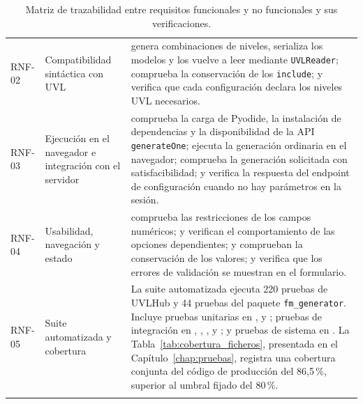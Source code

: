 \begin{longtable}{@{}P{1.3cm} P{2.6cm} P{\dimexpr\textwidth-3.9cm-4\tabcolsep\relax}@{}}
RNF-02 &
Compatibilidad sintáctica con UVL &
genera combinaciones de niveles, serializa los modelos y los vuelve a leer
mediante \texttt{UVLReader};
comprueba la conservación de los \texttt{include}; y
verifica que cada configuración declara los niveles UVL necesarios.
\\[0.9em]

RNF-03 &
Ejecución en el navegador e integración con el servidor &
comprueba la carga de Pyodide, la instalación de dependencias y la
disponibilidad de la API \texttt{generateOne};
ejecuta la generación ordinaria en el navegador;
comprueba la generación solicitada con satisfacibilidad; y
verifica la respuesta del endpoint de configuración cuando no hay parámetros
en la sesión.
\\[0.9em]

RNF-04 &
Usabilidad, navegación y estado &
comprueba las restricciones de los campos numéricos;
y
verifican el comportamiento de las opciones dependientes;
y
comprueban la conservación de los valores; y
verifica que los errores de validación se muestran en el formulario.
\\[0.9em]

RNF-05 &
Suite automatizada y cobertura &
La suite automatizada ejecuta 220 pruebas de UVLHub y 44 pruebas del paquete
\texttt{fm\_generator}. Incluye pruebas unitarias en
,  y
; pruebas de integración en
, ,
,  y
; y pruebas de sistema en
. La Tabla~\ref{tab:cobertura_ficheros}, presentada en
el Capítulo~\ref{chap:pruebas}, registra una cobertura conjunta del código de
producción del 86,5\,\%, superior al umbral fijado del 80\,\%.
\\

\bottomrule
\caption{Matriz de trazabilidad entre requisitos funcionales y no funcionales
y sus verificaciones.}
\label{tab:trazabilidad_rf_tests}

\end{longtable}
\endgroup

